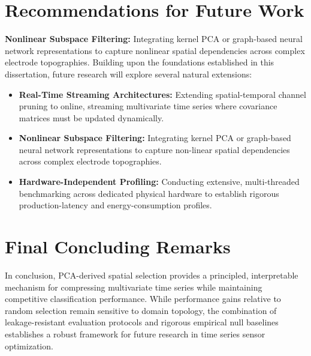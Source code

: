 \section{Recommendations for Future Work}
\noindent
\item \textbf{Nonlinear Subspace Filtering:}
Integrating kernel PCA \citep{scholkopf1998kernelpca} or graph-based neural
network representations to capture nonlinear spatial dependencies across
complex electrode topographies. Building upon the foundations established in this dissertation, future research will explore several natural extensions:
\begin{itemize}
    \item \textbf{Real-Time Streaming Architectures:} Extending spatial-temporal channel pruning to online, streaming multivariate time series where covariance matrices must be updated dynamically.
    \item \textbf{Nonlinear Subspace Filtering:} Integrating kernel PCA or graph-based neural network representations to capture non-linear spatial dependencies across complex electrode topographies.
    \item \textbf{Hardware-Independent Profiling:} Conducting extensive, multi-threaded benchmarking across dedicated physical hardware to establish rigorous production-latency and energy-consumption profiles.
\end{itemize}

\section{Final Concluding Remarks}
\noindent
In conclusion, PCA-derived spatial selection provides a principled, interpretable mechanism for compressing multivariate time series while maintaining competitive classification performance. While performance gains relative to random selection remain sensitive to domain topology, the combination of leakage-resistant evaluation protocols and rigorous empirical null baselines establishes a robust framework for future research in time series sensor optimization.